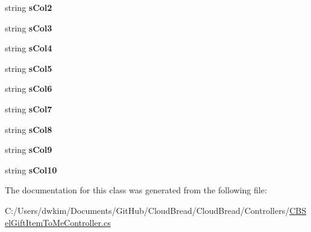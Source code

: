 \begin{DoxyCompactItemize}
\item 
string {\bfseries s\+Col2}\hypertarget{a00151_acb22b68847fd24c696629ab62cf56a49}{}\label{a00151_acb22b68847fd24c696629ab62cf56a49}

\item 
string {\bfseries s\+Col3}\hypertarget{a00151_a8d66a62bf6ff2d13a8011490d341cf02}{}\label{a00151_a8d66a62bf6ff2d13a8011490d341cf02}

\item 
string {\bfseries s\+Col4}\hypertarget{a00151_a8d32b7e1ec6559fc1a5b9118d6e04416}{}\label{a00151_a8d32b7e1ec6559fc1a5b9118d6e04416}

\item 
string {\bfseries s\+Col5}\hypertarget{a00151_a5c14f6547b1c6a70e6a021b90c5d6f17}{}\label{a00151_a5c14f6547b1c6a70e6a021b90c5d6f17}

\item 
string {\bfseries s\+Col6}\hypertarget{a00151_ad5f175acf2212865a052a3cd47dee7ce}{}\label{a00151_ad5f175acf2212865a052a3cd47dee7ce}

\item 
string {\bfseries s\+Col7}\hypertarget{a00151_a4141c4941120c18998840ba2bf007409}{}\label{a00151_a4141c4941120c18998840ba2bf007409}

\item 
string {\bfseries s\+Col8}\hypertarget{a00151_a4c2d93b1cb24504786e79c3e373a07a5}{}\label{a00151_a4c2d93b1cb24504786e79c3e373a07a5}

\item 
string {\bfseries s\+Col9}\hypertarget{a00151_af4c9648ec609b99ce2f199effde624b4}{}\label{a00151_af4c9648ec609b99ce2f199effde624b4}

\item 
string {\bfseries s\+Col10}\hypertarget{a00151_a14a94a772544dfc20d70b1abe19d8863}{}\label{a00151_a14a94a772544dfc20d70b1abe19d8863}

\end{DoxyCompactItemize}


The documentation for this class was generated from the following file\+:\begin{DoxyCompactItemize}
\item 
C\+:/\+Users/dwkim/\+Documents/\+Git\+Hub/\+Cloud\+Bread/\+Cloud\+Bread/\+Controllers/\hyperlink{a00218}{C\+B\+Sel\+Gift\+Item\+To\+Me\+Controller.\+cs}\end{DoxyCompactItemize}
